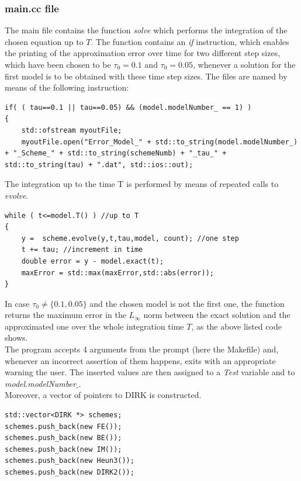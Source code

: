 \documentclass[11pt]{article}
\theoremstyle{theorem}
\theoremstyle{definition}
\begin{document}
\subsubsection{main.cc file}
The main file contains the function \emph{solve} which performs the integration of the chosen equation up to $T$. The function contains an \emph{if} instruction, which enables the printing of the approximation error over time for two different step sizes, which have been chosen to be $\tau_0=0.1$ and $\tau_0=0.05$, whenever a solution for the first model is to be obtained with these time step sizes. The files are named by means of the following instruction:

\begin{lstlisting}
if( ( tau==0.1 || tau==0.05) && (model.modelNumber_ == 1) )
{
	std::ofstream myoutFile;
	myoutFile.open("Error_Model_" + std::to_string(model.modelNumber_) + "_Scheme_" + std::to_string(schemeNumb) + "_tau_" + std::to_string(tau) + ".dat", std::ios::out);
\end{lstlisting}

The integration up to the time T is performed by means of repeated calls to \emph{evolve}.

\begin{lstlisting}
while ( t<=model.T() ) //up to T
{
	y =  scheme.evolve(y,t,tau,model, count); //one step
	t += tau; //increment in time
	double error = y - model.exact(t); 
	maxError = std::max(maxError,std::abs(error));
}
\end{lstlisting}

In case $\tau_0\neq\lbrace 0.1, 0.05\rbrace$ and the chosen model is not the first one,  the function returns the maximum error in the $L_\infty$ norm between the exact solution and the approximated one over the whole integration time $T$, as the above listed code shows.\\

The program accepts 4 arguments from the prompt (here the Makefile) and, whenever an incorrect assertion of them happens, exits with an appropriate warning the user. The inserted values are then assigned to a \emph{Test} variable and to \emph{model.modelNumber$\_$}.\\
Moreover, a vector of pointers to DIRK is constructed.\\

\begin{lstlisting}
std::vector<DIRK *> schemes;
schemes.push_back(new FE());
schemes.push_back(new BE());
schemes.push_back(new IM());
schemes.push_back(new Heun3());
schemes.push_back(new DIRK2());
\end{lstlisting}
\end{document}
